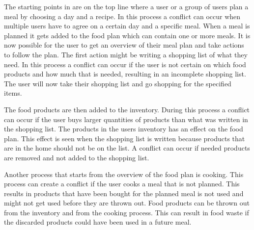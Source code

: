 The starting points in  are on the top line where a user or a group of users plan a meal by choosing a day and a recipe. In this process a conflict can occur when multiple users have to agree on a certain day and a specific meal. When a meal is planned it gets added to the food plan which can contain one or more meals. It is now possible for the user to get an overview of their meal plan and take actions to follow the plan. The first action might be writing a shopping list of what they need. In this process a conflict can occur if the user is not certain on which food products and how much that is needed, resulting in an incomplete shopping list. The user will now take their shopping list and go shopping for the specified items. 

The food products are then added to the inventory. During this process a conflict can occur if the user buys larger quantities of products than what was written in the shopping list. The products in the users inventory has an effect on the food plan. This effect is seen when the shopping list is written because products that are in the home should not be on the list. A conflict can occur if needed products are removed and not added to the shopping list. 

Another process that starts from the overview of the food plan is cooking. This process can create a conflict if the user cooks a meal that is not planned. This results in products that have been bought for the planned meal is not used and might not get used before they are thrown out. Food products can be thrown out from the inventory and from the cooking process. This can result in food waste if the discarded products could have been used in a future meal.      
   


      